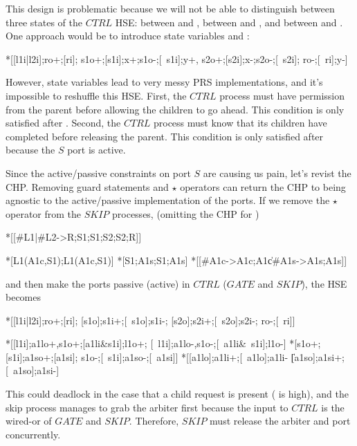 \documentclass[aer.tex]{subfiles}
\begin{document}
\noindent This design is problematic because 
we will not be able to distinguish between three states of the $CTRL$ HSE: 
between \code{[ri]} and ,
between \code{[$\neg$s1i]} and , and 
between \code{[$\neg$s2i]} and . 
One approach would be to introduce state variables  and :

\begin{hse}
  *[[l1i|l2i];ro+;[ri];
    s1o+;[s1i];x+;s1o-;[~s1i];y+,
    s2o+;[s2i];x-;s2o-;[~s2i];
    ro-;[~ri];y-]
\end{hse}

\noindent However, state variables lead to very messy PRS implementations, and
it's impossible to reshuffle this HSE. 
First, the $CTRL$ process must have permission from the parent before allowing the children to go ahead.
This condition is only satisfied after \code{[ri]}.
Second, the $CTRL$ process must know that its children have completed before releasing the parent.
This condition is only satisfied after \code{[$\neg$s2i]} because the $S$ port is active.

Since the active/passive constraints on port $S$ are causing us pain, let's revist the CHP.
Removing guard statements and $\star$ operators can return the CHP to being agnostic to the 
active/passive implementation of the ports. 
If we remove the $\star$ operator from the $SKIP$ processes, (omitting the CHP for )

\begin{csp}
  *[[#{L1}|#{L2}->R;S1;S1;S2;S2;R]]

  *[L1\star(A1c,S1);L1\star(A1c,S1)]
  *[S1;A1s;S1;A1s]
  *[[#{A1c}->A1c;A1c\|#{A1s}->A1s;A1s]]
\end{csp}

\noindent and then make the  ports passive (active) in $CTRL$ ($GATE$ and $SKIP$), the HSE becomes

\begin{hse}
  *[[l1i|l2i];ro+;[ri];
    [s1o];s1i+;[~s1o];s1i-;
    [s2o];s2i+;[~s2o];s2i-;
    ro-;[~ri]]
    
  *[[l1i];a1lo+,s1o+;[a1li&s1i];l1o+;
    [~l1i];a1lo-,s1o-;[~a1li&~s1i];l1o-]
  *[s1o+;[s1i];a1so+;[a1si];
    s1o-;[~s1i];a1so-;[~a1si]]
  *[[a1lo];a1li+;[~a1lo];a1li-
   \|[a1so];a1si+;[~a1so];a1si-]
\end{hse}

\noindent This could deadlock in the case that a child request is present ( is high),
and the skip process manages to grab the arbiter first because the  input to $CTRL$ 
is the wired-or of $GATE$ and $SKIP$. Therefore, $SKIP$ must release the arbiter and 
port concurrently.
\end{document}
